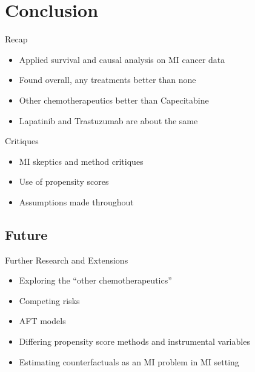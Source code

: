 \section{Conclusion}

\begin{frame}{Recap}
 \begin{itemize}
  \item Applied survival and causal analysis on MI cancer data
  \item Found overall,  any treatments better than none
  \item Other chemotherapeutics better than Capecitabine
  \item Lapatinib and Trastuzumab are about the same
 \end{itemize}

\end{frame}


\begin{frame}{Critiques}
 \begin{itemize}
  \item MI skeptics and method critiques
  \item Use of propensity scores
  \item Assumptions made throughout
  \end{itemize}

\end{frame}

\subsection{Future}
\begin{frame}{Further Research and Extensions}

\begin{itemize}
 \item Exploring the ``other chemotherapeutics''
 \item Competing risks
 \item AFT models
 \item Differing propensity score methods and instrumental variables
 \item Estimating counterfactuals as an MI problem in MI setting
 
\end{itemize}

 
\end{frame}

